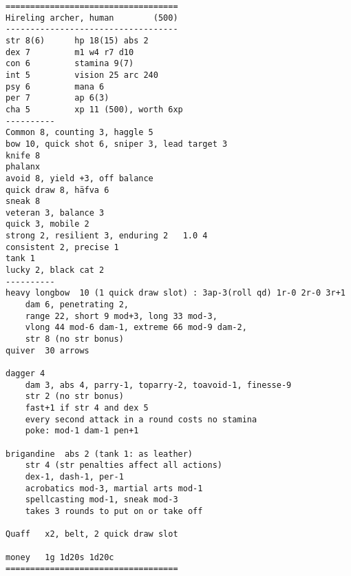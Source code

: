 \goodbreak \begin{samepage} \small \begin{verbatim}
===================================
Hireling archer, human        (500)
-----------------------------------
str	8(6)      hp 18(15) abs 2
dex	7         m1 w4 r7 d10
con	6         stamina 9(7)
int 5         vision 25 arc 240
psy	6         mana 6
per	7         ap 6(3)
cha	5         xp 11 (500), worth 6xp
----------
Common 8, counting 3, haggle 5
bow 10, quick shot 6, sniper 3, lead target 3
knife 8
phalanx
avoid 8, yield +3, off balance
quick draw 8, häfva 6
sneak 8
veteran 3, balance 3
quick 3, mobile 2
strong 2, resilient 3, enduring 2	1.0 4
consistent 2, precise 1
tank 1
lucky 2, black cat 2
----------
heavy longbow  10 (1 quick draw slot) : 3ap-3(roll qd) 1r-0 2r-0 3r+1
    dam 6, penetrating 2,
    range 22, short 9 mod+3, long 33 mod-3,
    vlong 44 mod-6 dam-1, extreme 66 mod-9 dam-2,
    str 8 (no str bonus)
quiver	30 arrows

dagger 4
    dam 3, abs 4, parry-1, toparry-2, toavoid-1, finesse-9
    str 2 (no str bonus)
    fast+1 if str 4 and dex 5
    every second attack in a round costs no stamina
    poke: mod-1 dam-1 pen+1

brigandine	abs 2 (tank 1: as leather)
    str 4 (str penalties affect all actions)
    dex-1, dash-1, per-1
    acrobatics mod-3, martial arts mod-1
    spellcasting mod-1, sneak mod-3
    takes 3 rounds to put on or take off

Quaff	x2, belt, 2 quick draw slot

money	1g 1d20s 1d20c
===================================
\end{verbatim} \normalsize \end{samepage}

\

